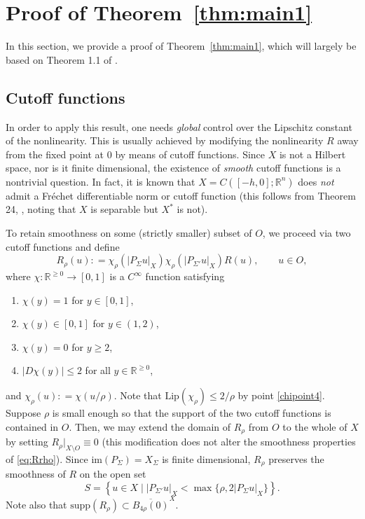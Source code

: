 \documentclass[a4paper, 12pt, oneside, reqno, notitlepage]{amsart}
\theoremstyle{plain}
\theoremstyle{definition}
\theoremstyle{remark}
\newcommand{\im}{\mathrm{im}}
\newcommand{\lip}{\mathrm{Lip}}
\begin{document}
\section{Proof of Theorem~\ref{thm:main1}}
\label{sect:proofmain1}

In this section, we provide a proof of Theorem~\ref{thm:main1}, which will largely be based on Theorem 1.1 of \cite{chen1997invariant}. 


\subsection{Cutoff functions}
\label{sect:cutoff}

In order to apply this result, one needs \textit{global} control over the Lipschitz constant of the nonlinearity.
This is usually achieved by modifying the nonlinearity $R$ away from the fixed point at $0$ by means of cutoff functions.
Since $X$ is not a Hilbert space, nor is it finite dimensional, the existence of \textit{smooth} cutoff functions is a nontrivial question.
In fact, it is known that $X = C([-h,0];\mathbb{R}^n)$ does \textit{not} admit a Fréchet differentiable norm or cutoff function (this follows from Theorem 24, \cite{FRY2002}, noting that $X$ is separable but $X^*$ is not).

To retain smoothness on some (strictly smaller) subset of $O$, we proceed via two cutoff functions 
and define
\begin{equation}
    R_\rho (u) : =  \chi_\rho ( |P_\Sigma u |_X) \chi_\rho (|P_{\Sigma'} u |_X) R(u), \qquad u \in O,
    \label{eq:Rrho}
\end{equation}
where $\chi: \mathbb{R}^{\geq 0} \to [0,1]$ is a $C^\infty$ function satisfying
\begin{enumerate}[label=\upshape{(\roman*)}]
    \item $\chi(y) = 1$ for $y \in [0,1]$,
    \item $\chi(y) \in [0,1]$ for $y \in (1,2)$,
    \item $\chi(y) = 0$ for $y \geq 2$,
    \item \label{chipoint4} $|D\chi (y)| \leq 2$ for all $y \in \mathbb{R}^{\geq 0}$,
\end{enumerate}
and $\chi_\rho(u) : = \chi(u/\rho)$.
Note that $\lip(\chi_\rho) \leq 2/\rho$ by point \ref{chipoint4}.
Suppose $\rho$ is small enough so that the support of the two cutoff functions is contained in $O$.
Then, we may extend the domain of $R_\rho$ from $O$ to the whole of $X$ by setting $R_\rho|_{X \setminus O} \equiv 0$ (this modification does not alter the smoothness properties of \eqref{eq:Rrho}).
Since $\im(P_\Sigma) = X_\Sigma$ is finite dimensional, $R_\rho $ preserves the smoothness of $R$ on the open set 
\begin{equation}
    S = \left\{    u \in X     \; \big| \;      |P_{\Sigma'} u |_X < \max\{\rho , 2 |P_\Sigma u|_X \}        \right\} . 
    \label{eq:smoothnessset}
\end{equation}
Note also that $\mathrm{supp}(R_\rho) \subset \overline{B_{4\rho}(0)}^X$.
\end{document}
